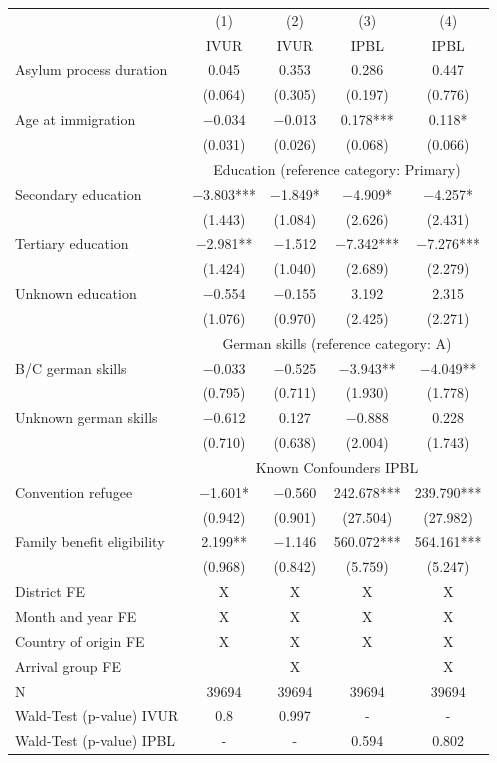 
\centering
\begin{tabular}[t]{lcccc}
\toprule
& (1) & (2) & (3) & (4) \\
  & IVUR & IVUR  & IPBL & IPBL \\
\midrule
Asylum process duration & \num{0.045} & \num{0.353} & \num{0.286} & \num{0.447}\\
 & (\num{0.064}) & (\num{0.305}) & (\num{0.197}) & (\num{0.776})\\
Age at immigration & \num{-0.034} & \num{-0.013} & \num{0.178}*** & \num{0.118}*\\
 & (\num{0.031}) & (\num{0.026}) & (\num{0.068}) & (\num{0.066})\\\midrule
& \multicolumn{4}{c}{Education (reference category: Primary)}\\Secondary education & \num{-3.803}*** & \num{-1.849}* & \num{-4.909}* & \num{-4.257}*\\
 & (\num{1.443}) & (\num{1.084}) & (\num{2.626}) & (\num{2.431})\\
Tertiary education & \num{-2.981}** & \num{-1.512} & \num{-7.342}*** & \num{-7.276}***\\
 & (\num{1.424}) & (\num{1.040}) & (\num{2.689}) & (\num{2.279})\\
Unknown education & \num{-0.554} & \num{-0.155} & \num{3.192} & \num{2.315}\\
 & (\num{1.076}) & (\num{0.970}) & (\num{2.425}) & (\num{2.271})\\
\midrule
& \multicolumn{4}{c}{German skills (reference category: A)}\\B/C german skills & \num{-0.033} & \num{-0.525} & \num{-3.943}** & \num{-4.049}**\\
 & (\num{0.795}) & (\num{0.711}) & (\num{1.930}) & (\num{1.778})\\
Unknown german skills & \num{-0.612} & \num{0.127} & \num{-0.888} & \num{0.228}\\
 & (\num{0.710}) & (\num{0.638}) & (\num{2.004}) & (\num{1.743})\\
\midrule
& \multicolumn{4}{c}{Known Confounders IPBL}\\Convention refugee & \num{-1.601}* & \num{-0.560} & \num{242.678}*** & \num{239.790}***\\
 & (\num{0.942}) & (\num{0.901}) & (\num{27.504}) & (\num{27.982})\\
Family benefit eligibility & \num{2.199}** & \num{-1.146} & \num{560.072}*** & \num{564.161}***\\
 & (\num{0.968}) & (\num{0.842}) & (\num{5.759}) & (\num{5.247})\\
\midrule
District FE & X & X & X & X\\
Month and year FE & X & X & X & X\\
Country of origin FE & X & X & X & X\\
Arrival group FE &  & X &  & X\\
\midrule
N & \num{39694} & \num{39694} & \num{39694} & \num{39694}\\
\midrule
Wald-Test (p-value) IVUR & 0.8 & 0.997 & - & -\\
Wald-Test (p-value) IPBL & - & - & 0.594 & 0.802\\
\bottomrule
\end{tabular}

